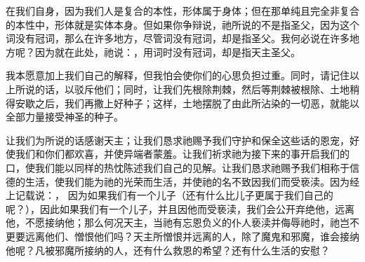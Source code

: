 在我们自身，因为我们人是复合的本性，形体属于身体；但在那单纯且完全非复合的本性中，形体就是实体本身。但如果你争辩说，祂所说的不是指圣父，因为这个词没有冠词，那么在许多地方，尽管词没有冠词，却是指圣父。我何必说在许多地方呢？因为就在此处，祂说：，用词时没有冠词，却是指天主圣父。\par

我本愿意加上我们自己的解释，但我怕会使你们的心思负担过重。同时，请记住以上所说的话，以驳斥他们；同时，让我们先根除荆棘，然后等荆棘被根除、土地稍得安歇之后，我们再撒上好种子；这样，土地摆脱了由此所沾染的一切恶，就能以全部力量接受神圣的种子。\par

让我们为所说的话感谢天主；让我们恳求祂赐予我们守护和保全这些话的恩宠，好使我们和你们都欢喜，并使异端者蒙羞。让我们祈求祂为接下来的事开启我们的口，使我们能以同样的热忱陈述我们自己的见解。让我们恳求祂赐予我们相称于信德的生活，使我们能为祂的光荣而生活，并使祂的名不致因我们而受亵渎。因为经上记载说：，  因为如果我们有一个儿子（还有什么比儿子更属于我们自己的呢？），因此如果我们有一个儿子，并且因他而受亵渎，我们会公开弃绝他，远离他，不愿接纳他；那么何况天主，当祂有忘恩负义的仆人亵渎并侮辱祂时，祂岂不更要远离他们、憎恨他们吗？天主所憎恨并远离的人，除了魔鬼和邪魔，谁会接纳他呢？凡被邪魔所接纳的人，还有什么救恩的希望？还有什么生活的安慰？\par

